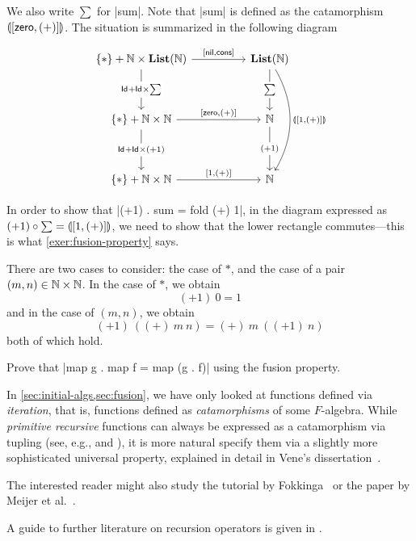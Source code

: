 \begin{solution}
  We also write $\sum$ for |sum|. Note that |sum| is defined as the catamorphism $\llparenthesis [\mathsf{zero}, (+)] \rrparenthesis$.
  The situation is summarized in the following diagram
  
  \[
    \begin{tikzcd}[row sep = huge, column sep = huge]
      \{*\} + \NN \times \List(\NN)
      \ar[d, "\Id + \Id \times \sum" description]
      \ar[r, "{[\nil, \cons]}"]
      &
      \List(\NN)
      \ar[d, "\sum" description]
      \ar[dd, bend left, "\catam{[1, (+)]}"]
      \\
      \{*\} + \NN \times \NN
      \ar[r, "{[\Zero, (+)]}"]
      \ar[d, "{\Id + \Id \times (+1)}" description]
      &
      \NN
      \ar[d, "{(+1)}" description]
      \\
      \{*\} + \NN \times \NN
      \ar[r, "{[1, (+)]}"]
      &
      \NN 
    \end{tikzcd}
  \]

  In order to show that |(+1) . sum = fold (+) 1|, in the diagram expressed as $(+1) \circ \sum = \llparenthesis [1, (+)] \rrparenthesis$, we need to show that the lower rectangle commutes---this is what  \cref{exer:fusion-property} says.

  There are two cases to consider: the case of $*$, and the case of a pair $(m,n) \in \mathbb{N}\times\mathbb{N}$.
  In the case of $*$, we obtain
  \[
    (+1)~0 = 1
  \]
  and in the case of $(m,n)$, we obtain
  \[
    (+1)~ ((+)~ m~ n) = (+)~ m~ ((+1)~n)
  \]
  both of which hold.
  
\end{solution}

\begin{exer}
  Prove that |map g . map f = map (g . f)| using the fusion property.
\end{exer}


\begin{reading*}
  In \cref{sec:initial-algs,sec:fusion}, we have only looked at functions defined via \emph{iteration}, that is, functions defined as \emph{catamorphisms} of some $F$-algebra.
  While \emph{primitive recursive} functions can always be expressed as a catamorphism via tupling (see, e.g., \cite[\S4]{DBLP:journals/jfp/Hutton99} and \cite[\S3.1]{vene_phd}), it is more natural specify them via a slightly more sophisticated universal property, explained in detail in Vene's dissertation~\cite[Chapter~3]{vene_phd}.

  The interested reader might also study the tutorial by Fokkinga~\cite{Fokkinga_homo-cata} or the paper by Meijer et al.~\cite{DBLP:conf/fpca/MeijerFP91}.
  
  A guide to further literature on recursion operators is given in \cite[\S6]{DBLP:journals/jfp/Hutton99}.
\end{reading*}

